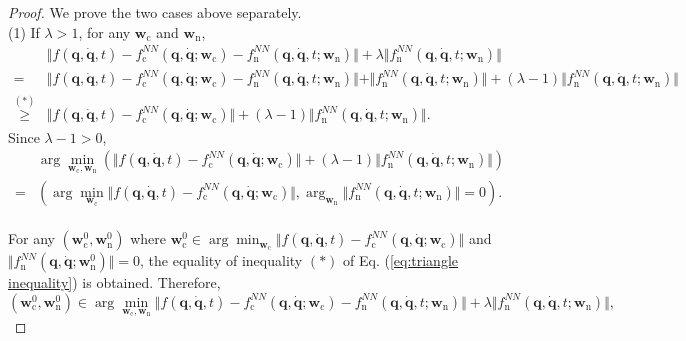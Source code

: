 \documentclass[aps,pre,reprint,superscriptaddress,nofootinbib,amsmath,amssymb]{revtex4-2}
\newcommand{\mat}[1]{\mathbf{#1}}
\newcommand{\q}{\mat{q}}
\newcommand{\qd}{\dot{\mat{q}}}
\newcommand{\w}{\boldsymbol{w}}
\begin{document}
\begin{proof}
	We prove the two cases above separately.
	\\
	(1) If $\lambda>1$, for any $\boldsymbol{w}_{\mathrm{c}}$ and $\boldsymbol{w}_{\mathrm{n}}$,
	\begin{align}
		\nonumber
		&\Vert f(\q,\qd, t)-f_{\mathrm{c}}^{NN}(\q,\qd;\boldsymbol{w}_{\mathrm{c}})-f_{\mathrm{n}}^{NN}(\q,\qd,t;\boldsymbol{w}_{\mathrm{n}})\Vert +\lambda \Vert f_{\mathrm{n}}^{NN}(\q,\qd,t;\boldsymbol{w}_{\mathrm{n}})\Vert
		\\
		\nonumber
		=&\Vert f(\q,\qd, t)-f_{\mathrm{c}}^{NN}(\q,\qd;\boldsymbol{w}_{\mathrm{c}})-f_{\mathrm{n}}^{NN}(\q,\qd,t;\boldsymbol{w}_{\mathrm{n}})\Vert+\Vert f_{\mathrm{n}}^{NN}(\q,\qd,t;\boldsymbol{w}_{\mathrm{n}})\Vert +(\lambda-1) \Vert f_{\mathrm{n}}^{NN}(\q,\qd,t;\boldsymbol{w}_{\mathrm{n}})\Vert
		\\
		\label{eq:triangle inequality}
		\overset{(*)}{\ge}& \Vert f(\q,\qd,t)-f_{\mathrm{c}}^{NN}(\q,\qd;\boldsymbol{w}_{\mathrm{c}})\Vert
		+(\lambda-1) \Vert f_{\mathrm{n}}^{NN}(\q,\qd,t;\boldsymbol{w}_{\mathrm{n}})\Vert.
	\end{align}
	Since $\lambda-1>0$, 
	\begin{align*}
		&\arg\min_{\boldsymbol{w}_{\mathrm{c}},\boldsymbol{w}_{\mathrm{n}}}\left(\Vert f( \q, \qd, t)-f_{\mathrm{c}}^{NN}(\q,\qd;\boldsymbol{w}_{\mathrm{c}})\Vert
		+(\lambda-1) \Vert f_{\mathrm{n}}^{NN}(\q,\qd,t;\boldsymbol{w}_{\mathrm{n}})\Vert\right)
		\\
		=&\left(\arg\min_{\boldsymbol{w}_{\mathrm{c}}} \Vert f(\q,\qd, t)-f_{\mathrm{c}}^{NN}(\q,\qd;\boldsymbol{w}_{\mathrm{c}})\Vert, \arg_{\boldsymbol{w}_{\mathrm{n}}}\Vert f_{\mathrm{n}}^{NN}(\q,\qd,t;\boldsymbol{w}_{\mathrm{n}})\Vert=0\right).
	\end{align*}
	\\
	For any $(\boldsymbol{w}^0_{\mathrm{c}},\boldsymbol{w}^0_{\mathrm{n}})$ where $\boldsymbol{w}^0_{\mathrm{c}}\in\arg\min_{\boldsymbol{w}_{\mathrm{c}}} \Vert f(\q,\qd, t)-f_{\mathrm{c}}^{NN}(\q,\qd;\boldsymbol{w}_{\mathrm{c}})\Vert$ and $\Vert f_{\mathrm{n}}^{NN}(\q,\qd;\w_{\mathrm{n}}^0)\Vert=0$, the equality of inequality $(*)$ of Eq. (\ref{eq:triangle inequality}) is obtained. Therefore,  
	\begin{equation*}
		(\boldsymbol{w}^0_{\mathrm{c}},\boldsymbol{w}^0_{\mathrm{n}})\in \arg\min_{\boldsymbol{w}_{\mathrm{c}},\boldsymbol{w}_{\mathrm{n}}} \Vert f(\q,\qd, t)-f_{\mathrm{c}}^{NN}(\q,\qd;\boldsymbol{w}_{\mathrm{c}})-f_{\mathrm{n}}^{NN}(\q,\qd,t;\boldsymbol{w}_{\mathrm{n}})\Vert +\lambda \Vert f_{\mathrm{n}}^{NN}(\q,\qd,t;\boldsymbol{w}_{\mathrm{n}})\Vert,

\end{equation*}
\end{proof}
\end{document}
